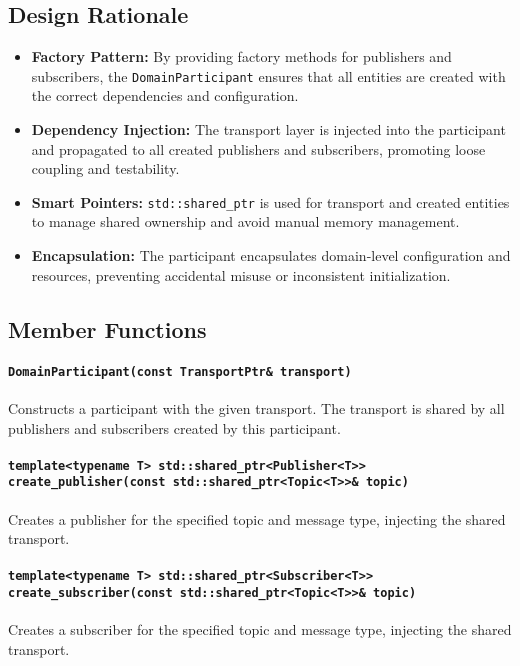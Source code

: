 \documentclass[12pt]{report}
\begin{document}
\subsection{Design Rationale}
\begin{itemize}
    \item \textbf{Factory Pattern:} By providing factory methods for publishers and subscribers, the \texttt{DomainParticipant} ensures that all entities are created with the correct dependencies and configuration.
    \item \textbf{Dependency Injection:} The transport layer is injected into the participant and propagated to all created publishers and subscribers, promoting loose coupling and testability.
    \item \textbf{Smart Pointers:} \texttt{std::shared\_ptr} is used for transport and created entities to manage shared ownership and avoid manual memory management.
    \item \textbf{Encapsulation:} The participant encapsulates domain-level configuration and resources, preventing accidental misuse or inconsistent initialization.
\end{itemize}

\subsection{Member Functions}
\paragraph{\texttt{DomainParticipant(const TransportPtr\& transport)}}
Constructs a participant with the given transport. The transport is shared by all publishers and subscribers created by this participant.

\paragraph{\texttt{template<typename T> std::shared\_ptr<Publisher<T>> create\_publisher(const std::shared\_ptr<Topic<T>>\& topic)}}
Creates a publisher for the specified topic and message type, injecting the shared transport.

\paragraph{\texttt{template<typename T> std::shared\_ptr<Subscriber<T>> create\_subscriber(const std::shared\_ptr<Topic<T>>\& topic)}}
Creates a subscriber for the specified topic and message type, injecting the shared transport.
\end{document}
